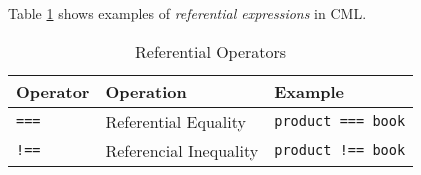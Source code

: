 Table \ref{tab:referential-expr-examples} shows
examples of \emph{referential expressions} in CML.

\begin{table}[H]
\centering
\begin{tabular}
{ l l l }
\hline
Operator & Operation & Example \\
\hline
\verb|===| & Referential Equality & \verb|product === book| \\
\verb|!==| & Referencial Inequality & \verb|product !== book| \\
\end{tabular}
\caption{Referential Operators}
\label{tab:referential-expr-examples}
\end{table}
